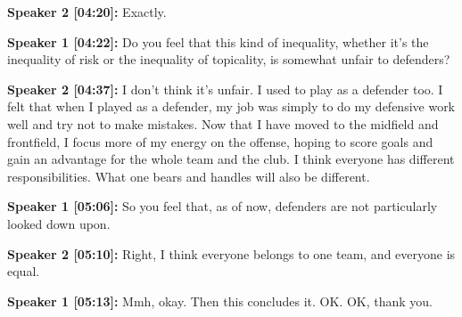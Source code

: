 \documentclass[11pt,a4paper]{article}
\begin{document}
\begin{linenumbers}
\vspace{0.5em}
\noindent \textbf{Speaker 2 [04:20]:} Exactly.

\vspace{0.5em}
\noindent \textbf{Speaker 1 [04:22]:} Do you feel that this kind of inequality, whether it's the inequality of risk or the inequality of topicality, is somewhat unfair to defenders?

\vspace{0.5em}
\noindent \textbf{Speaker 2 [04:37]:} I don't think it's unfair. I used to play as a defender too. I felt that when I played as a defender, my job was simply to do my defensive work well and try not to make mistakes. Now that I have moved to the midfield and frontfield, I focus more of my energy on the offense, hoping to score goals and gain an advantage for the whole team and the club. I think everyone has different responsibilities. What one bears and handles will also be different.

\vspace{0.5em}
\noindent \textbf{Speaker 1 [05:06]:} So you feel that, as of now, defenders are not particularly looked down upon.

\vspace{0.5em}
\noindent \textbf{Speaker 2 [05:10]:} Right, I think everyone belongs to one team, and everyone is equal.

\vspace{0.5em}
\noindent \textbf{Speaker 1 [05:13]:} Mmh, okay. Then this concludes it. OK. OK, thank you.

\end{linenumbers}
\end{document}
